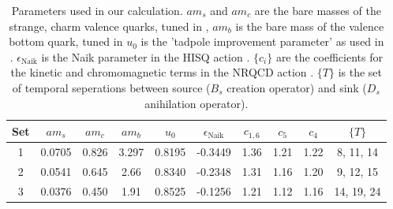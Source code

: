 \documentclass[a4paper,10pt]{article}
\numberwithin{equation}{section}
\begin{document}
\begin{table}
\begin{center}
 \begin{tabular}{||c c c c c c c c c c||}
 \hline
 Set & $am_s$ & $am_c$ & $am_b$ & $u_0$ & $\epsilon_{\text{Naik}}$ & $c_{1,6}$ & $c_5$ & $c_4$ & $\{T\}$ \\ [0.5ex] 
 \hline\hline
 1 & 0.0705 & 0.826 & 3.297 & 0.8195 & -0.3449 & 1.36 & 1.21 & 1.22 & 8, 11, 14 \\ [1ex]
 2 & 0.0541 & 0.645 & 2.66 & 0.8340 & -0.2348 & 1.31 & 1.16 & 1.20 & 9, 12, 15 \\ [1ex]
 3 & 0.0376 & 0.450 & 1.91 & 0.8525 & -0.1256 & 1.21 & 1.12 & 1.16 & 14, 19, 24 \\ [1ex]
 \hline
\end{tabular}
\caption{Parameters used in our calculation. $am_s$ and $am_c$ are the bare masses of the strange, charm valence quarks, tuned in \cite{PhysRevD.91.054508}, $am_b$ is the bare mass of the valence bottom quark, tuned in \cite{Dowdall:2011wh}
$u_0$ is the 'tadpole improvement parameter' as used in \cite{Dowdall:2011wh}.
$\epsilon_{\text{Naik}}$ is the Naik parameter in the HISQ action \cite{Follana:2006rc}.
$\{c_i\}$ are the coefficients for the kinetic and chromomagnetic terms in the NRQCD action \cite{Hammant:2013sca}. $\{T\}$
is the set of temporal seperations between source ($B_s$ creation operator) and sink ($D_s$ anihilation operator). \label{table:quarkmasses}
}
\end{center}
\end{table}
\end{document}
